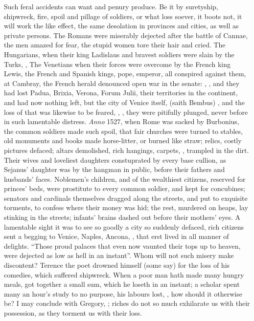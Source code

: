 Such feral accidents can want and penury produce. Be it by suretyship,
shipwreck, fire, spoil and pillage of soldiers, or what loss soever, it boots
not, it will work the like effect, the same desolation in provinces and cities,
as well as private persons. The Romans were miserably dejected after the battle
of Cannae, the men amazed for fear, the stupid women tore their hair and cried.
The Hungarians, when their king Ladislaus and bravest soldiers were slain by
the Turks, , \etc{} The Venetians when their forces were
overcome by the French king Lewis, the French and Spanish kings, pope, emperor,
all conspired against them, at Cambray, the French herald denounced open war in
the senate: , \etc{}, and they had lost Padua,
Brixia, Verona, Forum Julii, their territories in the continent, and had now
nothing left, but the city of Venice itself,  (saith
Bembus) , and the loss of that was
likewise to be feared, , \etc{}, they were pitifully plunged, never before in such lamentable
distress. \emph{Anno} 1527, when Rome was sacked by Burbonius, the common
soldiers made such spoil, that fair churches were turned
to stables, old monuments and books made horse-litter, or burned like straw;
relics, costly pictures defaced; altars demolished, rich hangings, carpets,
\etc{}, trampled in the dirt. Their wives and loveliest
daughters constuprated by every base cullion, as Sejanus' daughter was by the
hangman in public, before their fathers and husbands' faces. Noblemen's
children, and of the wealthiest citizens, reserved for princes' beds, were
prostitute to every common soldier, and kept for concubines; senators and
cardinals themselves dragged along the streets, and put to exquisite torments,
to confess where their money was hid; the rest, murdered on heaps, lay stinking
in the streets; infants' brains dashed out before their mothers' eyes. A
lamentable sight it was to see so goodly a city so suddenly defaced, rich
citizens sent a begging to Venice, Naples, Ancona, \etc{}, that erst lived in
all manner of delights. \enquote{Those proud palaces that even now
vaunted their tops up to heaven, were dejected as low as hell in an instant}.
Whom will not such misery make discontent? Terence the poet drowned himself
(some say) for the loss of his comedies, which suffered shipwreck. When a poor
man hath made many hungry meals, got together a small sum, which he loseth in
an instant; a scholar spent many an hour's study to no purpose, his labours
lost, \etc{}, how should it otherwise be? I may conclude with Gregory,
; riches do not so much exhilarate us with their
possession, as they torment us with their loss.

